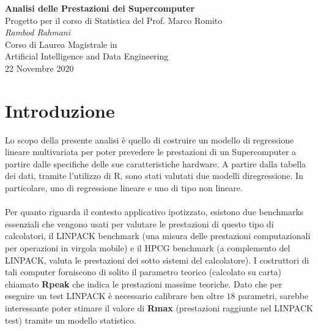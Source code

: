 \documentclass[11pt,a4paper]{article}
\begin{document}
\begin{center}
	\Large\textbf{Analisi delle Prestazioni dei Supercomputer}\\
	\vspace{0.2cm}
	\large{Progetto per il corso di Statistica del Prof. Marco Romito}\\
	\vspace{0.5cm}
	\large\textit{Rambod Rahmani}\\
	\vspace{0.2cm}
	\scriptsize{Corso di Laurea Magistrale in\\Artificial Intelligence and
	Data Engineering}\\
	\vspace{0.5cm}
	\normalsize{22 Novembre 2020}
\end{center}

\tableofcontents

\section{Introduzione}
Lo scopo della presente analisi \`e quello di costruire un modello di
regressione lineare multivariata per poter prevedere le prestazioni di un
Supercomputer a partire dalle specifiche delle sue caratteristiche hardware. A
partire dalla tabella dei dati, tramite l’utilizzo di R, sono stati valutati due
modelli diregressione. In particolare, uno di regressione lineare e uno di tipo
non lineare.\\
\\
Per quanto riguarda il contesto applicativo ipotizzato, esistono due benchmarks
essenziali che vengono usati per valutare le prestazioni di questo tipo di
calcolatori, il LINPACK benchmark (una misura delle prestazioni computazionali
per operazioni in virgola mobile) e il HPCG benchmark (a complemento del
LINPACK, valuta le prestazioni dei sotto sistemi del calcolatore). I costruttori
di tali computer forniscono di solito il parametro teorico (calcolato su carta)
chiamato \textbf{Rpeak} che indica le prestazioni massime teoriche. Dato che per
eseguire un test LINPACK \`e necessario calibrare ben oltre $18$ parametri,
sarebbe interessante poter stimare il valore di \textbf{Rmax} (prestazioni
raggiunte nel LINPACK test) tramite un modello statistico.
\end{document}
